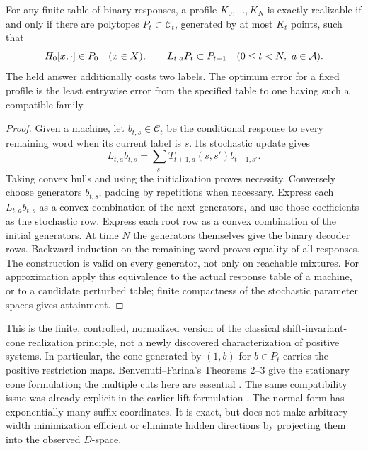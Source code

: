 \begin{proposition}\label{prop:hankel-form}
For any finite table of binary responses, a profile $K_0,\ldots,K_N$
is exactly realizable if and only if there are polytopes
$P_t\subset\mathcal C_t$, generated by at most $K_t$ points, such that
\begin{equation}\label{eq:compatible-hankel}
 H_0[x,\cdot]\in P_0\quad(x\in X),\qquad
 L_{t,a}P_t\subset P_{t+1}\quad(0\le t<N,\ a\in\mathcal A).
\end{equation}
The held answer additionally costs two labels. The optimum error for a
fixed profile is the least entrywise error from the specified table to
one having such a compatible family.
\end{proposition}
\begin{proof}
Given a machine, let $b_{t,s}\in\mathcal C_t$ be the conditional response
to every remaining word when its current label is $s$. Its stochastic
update gives
\[
 L_{t,a}b_{t,s}=\sum_{s'}T_{t+1,a}(s,s')b_{t+1,s'}.
\]
Taking convex hulls and using the initialization proves necessity.
Conversely choose generators $b_{t,s}$, padding by repetitions when
necessary. Express each $L_{t,a}b_{t,s}$ as a convex combination of the
next generators, and use those coefficients as the stochastic row.
Express each root row as a convex combination of the initial generators.
At time $N$ the generators themselves give the binary decoder rows.
Backward induction on the remaining word proves equality of all
responses. The construction is valid on every generator, not only on
reachable mixtures. For approximation apply this equivalence to the
actual response table of a machine, or to a candidate perturbed table;
finite compactness of the stochastic parameter spaces gives attainment.
\end{proof}

This is the finite, controlled, normalized version of the classical
shift-invariant-cone realization principle, not a newly discovered
characterization of positive systems. In particular, the cone generated
by $(1,b)$ for $b\in P_t$ carries the positive restriction maps.
Benvenuti--Farina's Theorems 2--3 give the stationary cone formulation;
the multiple cuts here are essential \cite{BF04}. The same compatibility
issue was already explicit in the earlier lift formulation \cite{GTF33}.
The normal form has exponentially many suffix coordinates. It is exact,
but does not make arbitrary width minimization efficient or eliminate
hidden directions by projecting them into the observed $D$-space.

